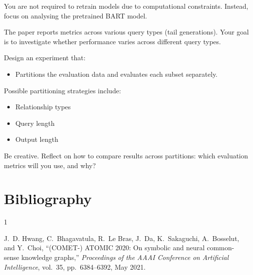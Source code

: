 \documentclass[11pt,a4paper]{article}
\begin{document}
You are not required to retrain models due to computational constraints. Instead, focus on analysing the pretrained BART model.

The paper reports metrics across various query types (tail generations). Your goal is to investigate whether performance varies across different query types.

Design an experiment that:

\begin{itemize}
	\item Partitions the evaluation data and evaluates each subset separately.
\end{itemize}

Possible partitioning strategies include:
\begin{itemize}
	\item Relationship types
	\item Query length
	\item Output length
\end{itemize}

Be creative. Reflect on how to compare results across partitions: which evaluation metrics will you use, and why?

\section{Bibliography}

\begin{thebibliography}{1}

	J.~D. Hwang, C.~Bhagavatula, R.~Le Bras, J.~Da, K.~Sakaguchi, A.~Bosselut, and Y.~Choi,
	``(COMET-) ATOMIC 2020: On symbolic and neural common-sense knowledge graphs,''
	\textit{Proceedings of the AAAI Conference on Artificial Intelligence},
	vol.~35, pp.~6384--6392, May 2021.

\end{thebibliography}
\end{document}
